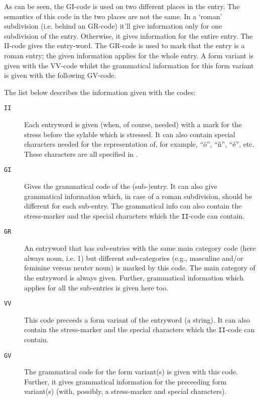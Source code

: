 As can be seen, the GI-code is used on two different places in the entry.
The semantics of this code in the two places are not the same. In a `roman' 
subdivision (i.e. behind an GR-code) it'll give information only for one 
subdivision of the entry. Otherwise, it gives information for the entire
entry. The II-code gives the entry-word. The GR-code is used to mark that the 
entry is a roman entry; the given information applies for the whole entry. A 
form variant is given with the VV-code whilst the grammatical information for 
this form variant is given with the following GV-code.

The list below describes the information given with the codes:

\begin{description}
  \item [\verb+II+] \hspace{3mm}
             Each entryword is given (when,
             of course, needed) with a mark for the stress before the sylable 
             which is stressed. It can also contain special characters needed
             for the representation of, for example, ``\"{o}'', ``\~{n}'',
             ``\'{e}'', etc. These characters are all specified in 
             \cite{JM:retro}.
  \item [\verb+GI+] \hspace{3mm} 
             Gives the grammatical code of the (sub-)entry. It can also give 
             grammatical information which, in case of a roman subdivision,
             should be different for each sub-entry. The grammatical info can
             also contain the stress-marker and the special characters which
             the \verb+II+-code can contain.
  \item [\verb+GR+] \hspace{3mm}
             An entryword that has sub-entries with the same main category code
             (here always noun, i.e. 1) but different sub-categories (e.g., 
             masculine and/or feminine versus neuter noun) is marked by this 
             code. The main category of the entryword is always given. Further, 
             grammatical information which applies for all the sub-entries is 
             given here too.
  \item [\verb+VV+] \hspace{3mm} 
             This code preceeds a form variant of the entryword (a string). 
             It can also contain the stress-marker and the special characters 
             which the \verb+II+-code can contain.
  \item [\verb+GV+] \hspace{3mm} 
             The grammatical code for the form variant(s) is given with this
             code. Further, it gives grammatical information for the preceeding 
             form variant(s) (with, possibly, a stress-marker and special 
             characters). 
\end{description}

